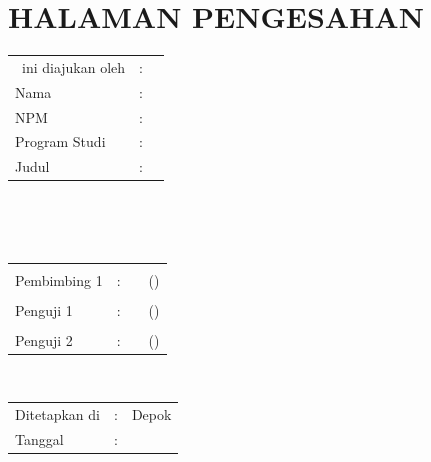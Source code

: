 %
%
%

\chapter*{HALAMAN PENGESAHAN}

\vspace*{0.4cm}
\noindent

\noindent
\begin{tabular}{ll p{9cm}}
	\type~ini diajukan oleh & : &            \\
	Nama                    & : & \penulis{} \\
	NPM                     & : & \npm{}     \\
	Program Studi           & : & \program{} \\
	Judul \type             & : & \judul{}   \\
\end{tabular} \\

\vspace*{1.0cm}

\noindent {}\\[0.2cm]

\begin{center}
\end{center}

\vspace*{0.3cm}

\begin{tabular}{l l l l }
	             &   &                   &                   \\
	Pembimbing 1 & : & \pembimbingSatu{} & (\hspace*{3.0cm}) \\
	             &   &                   &                   \\
	Penguji 1    & : & \pengujiSatu{}    & (\hspace*{3.0cm}) \\
	             &   &                   &                   \\
	Penguji 2    & : & \pengujiDua{}     & (\hspace*{3.0cm}) \\
\end{tabular}\\

\vspace*{2.0cm}

\begin{tabular}{ll l}
	Ditetapkan di & : & Depok           \\
	Tanggal       & : & \tanggalLulus{} \\
\end{tabular}


\newpage
